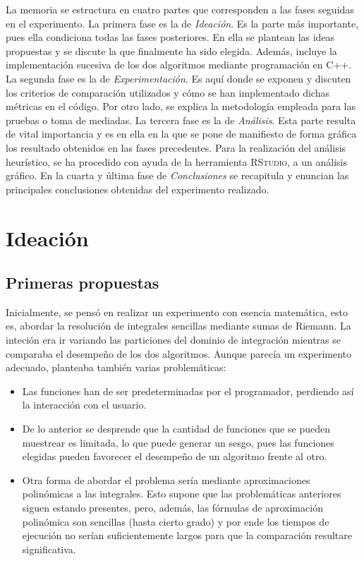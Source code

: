 \documentclass[12pt,a4paper]{article}
\begin{document}
La memoria se estructura en cuatro partes que corresponden a las fases seguidas en el experimento.
La primera fase es la de \textit{Ideación}. Es la parte más importante, pues ella condiciona todas las fases posteriores. En ella se plantean las ideas propuestas y se discute la que finalmente ha sido elegida. Además, incluye la implementación sucesiva de los dos algoritmos mediante programación en C++.
La segunda fase es la de \textit{Experimentación}. Es aquí donde se exponen y discuten los criterios de comparación utilizados y cómo se han implementado dichas métricas en el código. Por otro lado, se explica la metodología empleada para las pruebas o toma de mediadas.
La tercera fase es la de \textit{Análisis}. Esta parte resulta de vital importancia y es en ella en la que se pone de manifiesto de forma gráfica los resultado obtenidos en las fases precedentes. Para la realización del análisis heurístico, se ha procedido con ayuda de la herramienta \textsc{RStudio}, a un análisis gráfico.
En la cuarta y última fase de \textit{Conclusiones} se recapitula y enuncian las principales conclusiones obtenidas del experimento realizado.

\section{Ideación}
\subsection{Primeras propuestas}

Inicialmente, se pensó en realizar un experimento con esencia matemática, esto es, abordar la resolución de integrales sencillas mediante sumas de Riemann. La inteción era ir variando las particiones del dominio de integración mientras se comparaba el desempeño de los dos algoritmos. Aunque parecía un experimento adecuado, planteaba también varias problemáticas: 

\begin{itemize}
	\item Las funciones han de ser predeterminadas por el programador, perdiendo así la interacción con el usuario.
	\item De lo anterior se desprende que la cantidad de funciones que se pueden muestrear es limitada, lo que puede generar un sesgo, pues las funciones elegidas pueden favorecer el desempeño de un algoritmo frente al otro. 
	\item Otra forma de abordar el problema sería mediante aproximaciones polinómicas a las integrales. Esto supone que las problemáticas anteriores siguen estando presentes, pero, además, las fórmulas de aproximación polinómica son sencillas (hasta cierto grado) y por ende los tiempos de ejecución no serían suficientemente largos para que la comparación resultare significativa. 
\end{itemize}
\end{document}
